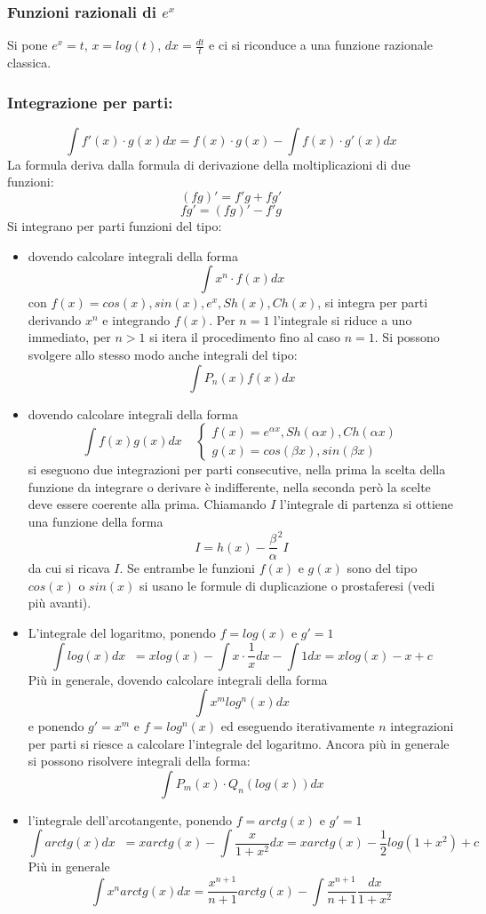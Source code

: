 \documentclass[a4paper, 9pt]{report}
\begin{document}
\subsubsection*{Funzioni razionali di $e^x$}
Si pone $e^x = t$, $x= log(t)$, $dx = \frac{dt}{t}$ e ci si riconduce a una funzione razionale classica.
\subsubsection*{Integrazione per parti:}
\[
    \int f'(x) \cdot  g(x) dx = f(x) \cdot g(x) - \int f(x) \cdot g'(x)dx
\]
La formula deriva dalla formula di derivazione della moltiplicazioni di due funzioni:
\[
    (fg)' = f'g + fg'
\]
\[
    fg' = (fg)' - f'g
\]
Si integrano per parti funzioni del tipo:
\begin{itemize}
    \item dovendo calcolare integrali della forma
    \[
        \int x^n \cdot f(x) dx
    \]
    con $f(x) = cos(x), sin(x), e^x, Sh(x), Ch(x)$, si integra per parti derivando $x^n$ e integrando $f(x)$. Per $n=1$ l'integrale si riduce a uno immediato, per $n>1$ si itera il procedimento fino al caso $n=1$. Si possono svolgere allo stesso modo anche integrali del tipo:
    \[
        \int P_n(x) f(x) dx
    \]
    \item dovendo calcolare integrali della forma
    \[
        \int f(x) g(x) dx \;\;\;\; \begin{cases}
            f(x) = e^{\alpha x}, Sh(\alpha x), Ch( \alpha x) \\
            g(x) = cos( \beta x), sin(\beta x)
        \end{cases}
    \]
    si eseguono due integrazioni per parti consecutive, nella prima la scelta della funzione da integrare o derivare è indifferente, nella seconda però la scelte deve essere coerente alla prima. Chiamando $I$ l'integrale di partenza si ottiene una funzione della forma
    \[
        I = h(x) - \frac{\beta}{\alpha}^2 I
    \]
    da cui si ricava $I$.\newline
    Se entrambe le funzioni $f(x)$ e $g(x)$ sono del tipo $cos(x)$ o $sin(x)$ si usano le formule di duplicazione o prostaferesi (vedi più avanti).
    \item L'integrale del logaritmo, ponendo $f= log(x)$ e $g' =1$
    \[
        \int log(x) dx \;\; = xlog(x) - \int x \cdot  \frac{1}{x} dx - \int 1 dx = x log(x) -x + c
    \]
    Più in generale, dovendo calcolare integrali della forma
    \[
        \int x^m log^n(x) dx
    \]
    e ponendo $g' = x^m$ e $f = log^n(x)$ ed eseguendo iterativamente $n$ integrazioni per parti si riesce a calcolare l'integrale del logaritmo. Ancora più in generale si possono risolvere integrali della forma:
    \[
        \int P_m(x) \cdot Q_n(log(x)) dx 
    \]
    \item l'integrale dell'arcotangente, ponendo $f= arctg(x)$ e $g' =1$
    \[
        \int arctg (x) dx \;\; = x arctg(x) -\int \frac{x}{1+x^2}dx = x arctg(x) -\frac{1}{2}log(1+x^2) + c 
    \]
    Più in generale
    \[
        \int x^n arctg(x) dx  = \frac{x^{n+1}}{n+1}arctg(x) - \int\frac{x^{n+1}}{n+1} \frac{dx}{1+x^2}
    \]
\end{itemize}
\end{document}
